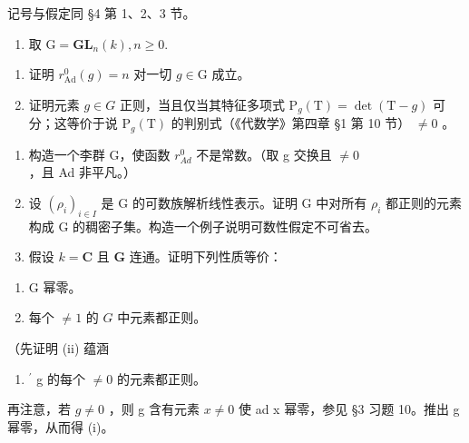 
记号与假定同 §4 第 1、2、3 节。

\begin{enumerate}
\def\labelenumi{\arabic{enumi})}
\tightlist
\item
  取 \(\mathrm{G} = \mathbf{GL}_{n}(k), n \geq 0.\)
\end{enumerate}

\begin{enumerate}
\def\labelenumi{\alph{enumi})}
\item
  证明 \(r_{\mathrm{Ad}}^0 (g) = n\) 对一切 \(g \in \mathrm{G}\) 成立。
\item
  证明元素 \(g \in G\) 正则，当且仅当其特征多项式 \(\mathrm{P}_{g}(\mathrm{T}) = \det(\mathrm{T} - g)\) 可分；这等价于说 \(\mathrm{P}_{g}(\mathrm{T})\) 的判别式（《代数学》第四章 §1 第 10 节） \(\neq 0\) 。
\end{enumerate}

\begin{enumerate}
\def\labelenumi{\arabic{enumi})}
\setcounter{enumi}{1}
\item
  构造一个李群 G，使函数 \(r_{Ad}^{0}\) 不是常数。（取 g 交换且 \(\neq 0\) ，且 Ad 非平凡。）
\item
  设 \((\rho_{i})_{i\in I}\) 是 G 的可数族解析线性表示。证明 G 中对所有 \(\rho_{i}\) 都正则的元素构成 G 的稠密子集。构造一个例子说明可数性假定不可省去。
\item
  假设 \(k = \mathbf{C}\) 且 \(\mathbf{G}\) 连通。证明下列性质等价：
\end{enumerate}

\begin{enumerate}
\def\labelenumi{(\roman{enumi})}
\item
  G 幂零。
\item
  每个 \(\neq 1\) 的 \(G\) 中元素都正则。
\end{enumerate}

（先证明 (ii) 蕴涵

\begin{enumerate}
\def\labelenumi{(\roman{enumi})}
\setcounter{enumi}{1}
\tightlist
\item
  \(^{\prime}\) g 的每个 \(\neq 0\) 的元素都正则。
\end{enumerate}

再注意，若 \(g \neq 0\) ，则 g 含有元素 \(x \neq 0\) 使 ad x 幂零，参见 §3 习题 10。推出 g 幂零，从而得 (i)。

